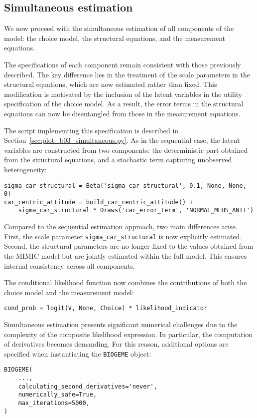\documentclass[12pt,a4paper]{article}
\begin{document}
\clearpage
\subsection{Simultaneous estimation}

We now proceed with the simultaneous estimation of all components of
the model: the choice model, the structural equations, and the
measurement equations.

The specifications of each component remain consistent with those
previously described. The key difference lies in the treatment of the
scale parameters in the structural equations, which are now estimated
rather than fixed. This modification is motivated by the inclusion of
the latent variables in the utility specification of the choice
model. As a result, the error terms in the structural equations can
now be disentangled from those in the measurement equations.

The script implementing this specification is described in
Section~\ref{sec:plot_b03_simultaneous.py}. As in the sequential case,
the latent variables are constructed from two components: the
deterministic part obtained from the structural equations, and a
stochastic term capturing unobserved heterogeneity:
\begin{lstlisting}
sigma_car_structural = Beta('sigma_car_structural', 0.1, None, None, 0)
car_centric_attitude = build_car_centric_attitude() +
    sigma_car_structural * Draws('car_error_term', 'NORMAL_MLHS_ANTI')
\end{lstlisting}

Compared to the sequential estimation approach, two main differences
arise. First, the scale parameter \lstinline$sigma_car_structural$ is
now explicitly estimated. Second, the structural parameters are no
longer fixed to the values obtained from the MIMIC model but are
jointly estimated within the full model. This ensures internal
consistency across all components.

The conditional likelihood function now combines the contributions of
both the choice model and the measurement model:
\begin{lstlisting}
cond_prob = logit(V, None, Choice) * likelihood_indicator
\end{lstlisting}

Simultaneous estimation presents significant numerical challenges due
to the complexity of the composite likelihood expression. In
particular, the computation of derivatives becomes demanding. For this
reason, additional options are specified when instantiating the
\lstinline$BIOGEME$ object:
\begin{lstlisting}
BIOGEME(
    ...,
    calculating_second_derivatives='never',
    numerically_safe=True,
    max_iterations=5000,
)
\end{lstlisting}
\end{document}
